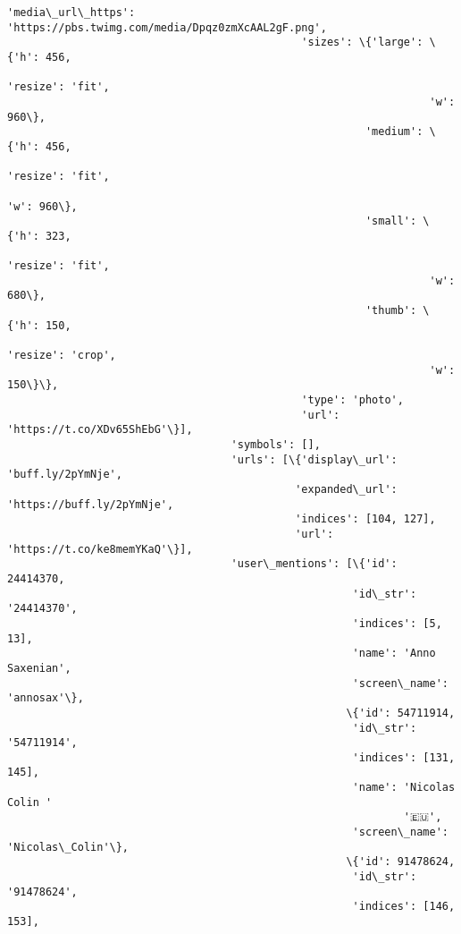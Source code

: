 \documentclass[11pt]{article}
\begin{document}
\begin{Verbatim}[commandchars=\\\{\}]
                                              'media\_url\_https': 'https://pbs.twimg.com/media/Dpqz0zmXcAAL2gF.png',
                                              'sizes': \{'large': \{'h': 456,
                                                                  'resize': 'fit',
                                                                  'w': 960\},
                                                        'medium': \{'h': 456,
                                                                   'resize': 'fit',
                                                                   'w': 960\},
                                                        'small': \{'h': 323,
                                                                  'resize': 'fit',
                                                                  'w': 680\},
                                                        'thumb': \{'h': 150,
                                                                  'resize': 'crop',
                                                                  'w': 150\}\},
                                              'type': 'photo',
                                              'url': 'https://t.co/XDv65ShEbG'\}],
                                   'symbols': [],
                                   'urls': [\{'display\_url': 'buff.ly/2pYmNje',
                                             'expanded\_url': 'https://buff.ly/2pYmNje',
                                             'indices': [104, 127],
                                             'url': 'https://t.co/ke8memYKaQ'\}],
                                   'user\_mentions': [\{'id': 24414370,
                                                      'id\_str': '24414370',
                                                      'indices': [5, 13],
                                                      'name': 'Anno Saxenian',
                                                      'screen\_name': 'annosax'\},
                                                     \{'id': 54711914,
                                                      'id\_str': '54711914',
                                                      'indices': [131, 145],
                                                      'name': 'Nicolas Colin '
                                                              '🇪🇺',
                                                      'screen\_name': 'Nicolas\_Colin'\},
                                                     \{'id': 91478624,
                                                      'id\_str': '91478624',
                                                      'indices': [146, 153],

\end{Verbatim}
\end{document}
